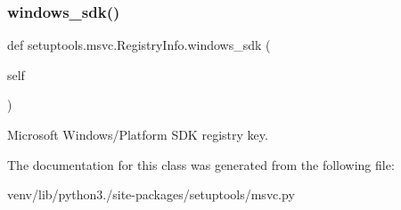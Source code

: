 \subsubsection{\texorpdfstring{windows\+\_\+sdk()}{windows\_sdk()}}
{\footnotesize\ttfamily def setuptools.\+msvc.\+Registry\+Info.\+windows\+\_\+sdk (\begin{DoxyParamCaption}\item[{}]{self }\end{DoxyParamCaption})}

\begin{DoxyVerb}Microsoft Windows/Platform SDK registry key.
\end{DoxyVerb}
 

The documentation for this class was generated from the following file\+:\begin{DoxyCompactItemize}
\item 
venv/lib/python3./site-\/packages/setuptools/msvc.\+py\end{DoxyCompactItemize}
